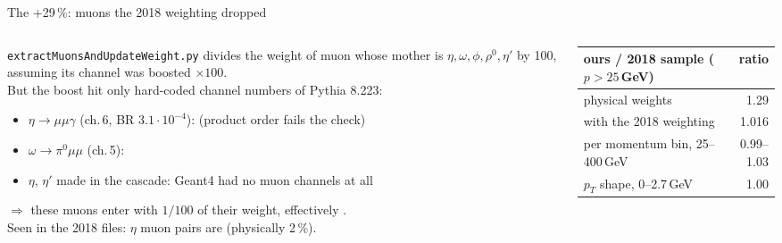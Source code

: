 \documentclass[aspectratio=169,10pt]{beamer}
\begin{document}
\begin{frame}{The +29\,\%: muons the 2018 weighting dropped}
  \begin{columns}[c]
    \begin{column}{0.52\textwidth}\footnotesize
      \texttt{extractMuonsAndUpdateWeight.py} divides the weight of  muon whose mother is $\eta,\omega,\phi,\rho^0,\eta'$ by 100, assuming its channel was boosted $\times100$.\\[1.5mm]
      But the boost hit only hard-coded channel numbers of Pythia 8.223:
      \begin{itemize}\footnotesize
        \item $\eta\to\mu\mu\gamma$ (ch.\,6, BR $3.1\cdot10^{-4}$):  (product order fails the check)
        \item $\omega\to\pi^0\mu\mu$ (ch.\,5): 
        \item $\eta$, $\eta'$ made in the cascade: Geant4 had no muon channels at all
      \end{itemize}
      $\Rightarrow$ these muons enter with $1/100$ of their weight, effectively .\\[1.5mm]
      Seen in the 2018 files: $\eta$ muon pairs are  (physically 2\,\%).
    \end{column}
    \begin{column}{0.44\textwidth}\footnotesize
      \begin{tabular}{@{}lr@{}}
        \toprule
        ours / 2018 sample ($p>25$\,GeV) & ratio\\
        \midrule
        physical weights & \num{1.29}\\
        with the 2018 weighting & \num{1.016}\\
        per momentum bin, 25--400\,GeV & 0.99--1.03\\
        $p_T$ shape, 0--2.7\,GeV & 1.00\\
        \bottomrule
      \end{tabular}\\[3mm]
      \\[2mm]
    \end{column}
  \end{columns}
\end{frame}
\end{document}
